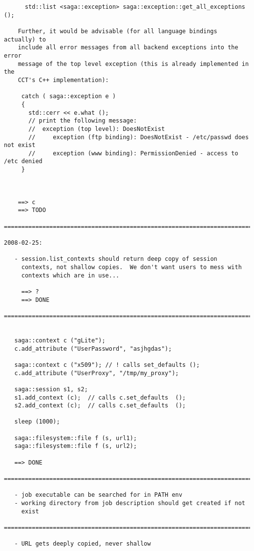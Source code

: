 \documentclass{article}
\begin{document}
\begin{verbatim}
      std::list <saga::exception> saga::exception::get_all_exceptions ();

    Further, it would be advisable (for all language bindings actually) to
    include all error messages from all backend exceptions into the error
    message of the top level exception (this is already implemented in the
    CCT's C++ implementation):

     catch ( saga::exception e )
     {
       std::cerr << e.what ();
       // print the following message:
       //  exception (top level): DoesNotExist
       //     exception (ftp binding): DoesNotExist - /etc/passwd does not exist
       //     exception (www binding): PermissionDenied - access to /etc denied
     }



    ==> c
    ==> TODO
    
=========================================================================

2008-02-25:

   - session.list_contexts should return deep copy of session
     contexts, not shallow copies.  We don't want users to mess with
     contexts which are in use...

     ==> ?
     ==> DONE

=========================================================================

   
   saga::context c ("gLite"); 
   c.add_attribute ("UserPassword", "asjhgdas");

   saga::context c ("x509"); // ! calls set_defaults ();
   c.add_attribute ("UserProxy", "/tmp/my_proxy");

   saga::session s1, s2;
   s1.add_context (c);  // calls c.set_defaults  ();
   s2.add_context (c);  // calls c.set_defaults  ();

   sleep (1000);

   saga::filesystem::file f (s, url1);
   saga::filesystem::file f (s, url2);

   ==> DONE

=========================================================================

   - job executable can be searched for in PATH env
   - working directory from job description should get created if not
     exist

=========================================================================

   - URL gets deeply copied, never shallow


\end{verbatim}
\end{document}

